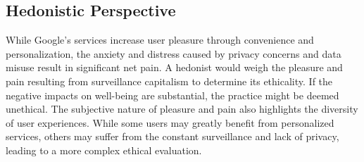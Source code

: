 \subsection{Hedonistic Perspective}\label{subsec:hedonistic-perspective}
While Google's services increase user pleasure through convenience and personalization, the anxiety and distress caused by privacy concerns and data misuse result in significant net pain.
A hedonist would weigh the pleasure and pain resulting from surveillance capitalism to determine its ethicality.
If the negative impacts on well-being are substantial, the practice might be deemed unethical.
The subjective nature of pleasure and pain also highlights the diversity of user experiences.
While some users may greatly benefit from personalized services, others may suffer from the constant surveillance and lack of privacy, leading to a more complex ethical evaluation.